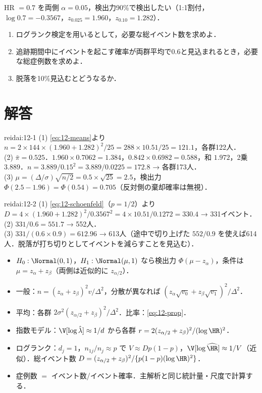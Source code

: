 \begin{reidai}[イベント数]\label{reidai:12-2}
HR $=0.7$ を両側 $\alpha=0.05$，検出力90\%で検出したい（1:1割付，$\log0.7=-0.3567$，$z_{0.025}=1.960$，$z_{0.10}=1.282$）．
\begin{enumerate}[label=(\arabic*)]
\item ログランク検定を用いるとして，必要な総イベント数を求めよ．
\item 追跡期間中にイベントを起こす確率が両群平均で0.6と見込まれるとき，必要な総症例数を求めよ．
\item 脱落を10\%見込むとどうなるか．
\end{enumerate}
\end{reidai}

\section{解答}\label{sec:12-sol}
\begin{kaitou}{reidai:12-1}
(1) \cref{eq:12-means}より $n=2\times144\times(1.960+1.282)^2/25=288\times10.51/25=121.1$，各群122人．\\
(2) $\bar\pi=0.525$．$1.960\times0.7062=1.384$，$0.842\times0.6982=0.588$，和 $1.972$，2乗 $3.889$．$n=3.889/0.15^2=3.889/0.0225=172.8$ → 各群173人．\\
(3) $\mu=(\Delta/\sigma)\sqrt{n/2}=0.5\times\sqrt{25}=2.5$，検出力 $\Phi(2.5-1.96)=\Phi(0.54)=0.705$（反対側の棄却確率は無視）．
\end{kaitou}

\begin{kaitou}{reidai:12-2}
(1) \cref{eq:12-schoenfeld}（$p=1/2$）より $D=4\times(1.960+1.282)^2/0.3567^2=4\times10.51/0.1272=330.4$ → 331イベント．\\
(2) $331/0.6=551.7$ → 552人．\\
(3) $331/(0.6\times0.9)=612.96$ → 613人（途中で切り上げた $552/0.9$ を使えば614人．脱落が打ち切りとしてイベントを減らすことを見込む）．
\end{kaitou}

\begin{summarybox}
\begin{itemize}
\item $H_0:\Normal(0,1)$，$H_1:\Normal(\mu,1)$ なら検出力 $\Phi(\mu-z_\alpha)$，条件は $\mu=z_\alpha+z_\beta$（両側は近似的に $z_{\alpha/2}$）．
\item 一般：$n=(z_\alpha+z_\beta)^2v/\Delta^2$，分散が異なれば $(z_\alpha\sqrt{v_0}+z_\beta\sqrt{v_1})^2/\Delta^2$．
\item 平均：各群 $2\sigma^2(z_{\alpha/2}+z_\beta)^2/\Delta^2$．比率：\cref{eq:12-prop}．
\item 指数モデル：$\V[\log\hat\lambda]\approx1/d$ から各群 $r=2(z_{\alpha/2}+z_\beta)^2/(\log\HR)^2$．
\item ログランク：$d_j=1$，$n_{1j}/n_j\approx p$ で $V\approx Dp(1-p)$，$\V[\log\widehat{\HR}]\approx1/V$（近似）．総イベント数 $D=(z_{\alpha/2}+z_\beta)^2/\{p(1-p)(\log\HR)^2\}$．
\item 症例数 $=$ イベント数/イベント確率．主解析と同じ統計量・尺度で計算する．
\end{itemize}
\end{summarybox}
